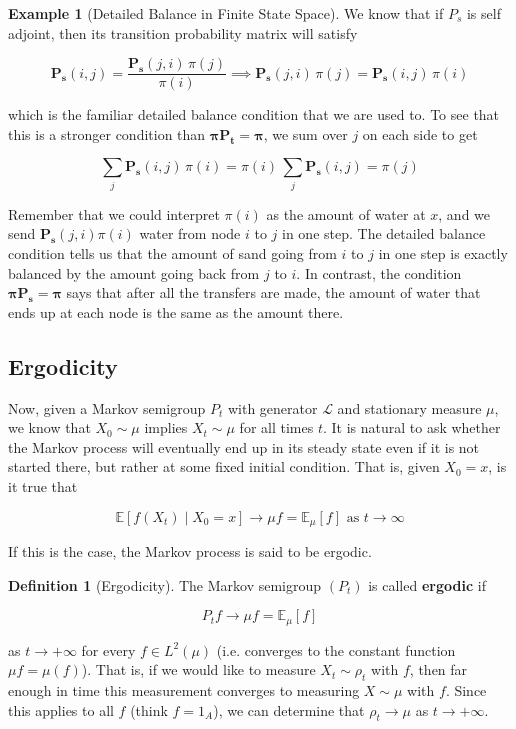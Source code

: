 \documentclass{article}
\theoremstyle{definition}
\newtheorem{example}{Example}[section]
\theoremstyle{remark}
\theoremstyle{definition}
\newtheorem{definition}{Definition}[section]
\begin{document}
    \begin{example}[Detailed Balance in Finite State Space]
      We know that if $P_s$ is self adjoint, then its transition probability matrix will satisfy 

        \[\mathbf{P_s}(i, j) = \frac{\mathbf{P_s}(j, i) \, \pi(j)}{\pi(i)} \implies \mathbf{P_s}(j, i) \, \pi(j) = \mathbf{P_s}(i, j) \, \pi(i)\]

      which is the familiar detailed balance condition that we are used to. To see that this is a stronger condition than $\boldsymbol{\pi} \mathbf{P_t} = \boldsymbol{\pi}$, we sum over $j$ on each side to get 

        \[\sum_j \mathbf{P_s}(i, j) \, \pi(i) = \pi(i) \, \sum_j \mathbf{P_s}(i, j) = \pi(j)\]

      Remember that we could interpret $\pi(i)$ as the amount of water at $x$, and we send $\mathbf{P_s}(j, i) \pi(i)$ water from node $i$ to $j$ in one step. The detailed balance condition tells us that the amount of sand going from $i$ to $j$ in one step is exactly balanced by the amount going back from $j$ to $i$. In contrast, the condition $\boldsymbol{\pi} \mathbf{P_s} = \boldsymbol{\pi}$ says that after all the transfers are made, the amount of water that ends up at each node is the same as the amount there. 
    \end{example}

  \subsection{Ergodicity}

    Now, given a Markov semigroup $P_t$ with generator $\mathscr{L}$ and stationary measure $\mu$, we know that $X_0 \sim \mu$ implies $X_t \sim \mu$ for all times $t$. It is natural to ask whether the Markov process will eventually end up in its steady state even if it is not started there, but rather at some fixed initial condition. That is, given $X_0 = x$, is it true that 

      \[\mathbb{E}[f(X_t) \mid X_0 = x] \rightarrow \mu f = \mathbb{E}_\mu [f] \text{ as } t \rightarrow \infty\]

    If this is the case, the Markov process is said to be ergodic. 

    \begin{definition}[Ergodicity]
      The Markov semigroup $(P_t)$ is called \textbf{ergodic} if 

        \[P_t f \rightarrow \mu f = \mathbb{E}_\mu [f]\]

      as $t \rightarrow +\infty$ for every $f \in L^2 (\mu)$ (i.e. converges to the constant function $\mu f = \mu(f)$). That is, if we would like to measure $X_t \sim \rho_t$ with $f$, then far enough in time this measurement converges to measuring $X \sim \mu$ with $f$. Since this applies to all $f$ (think $f = 1_A$), we can determine that $\rho_t \rightarrow \mu$ as $t \rightarrow +\infty$. 
    \end{definition}
\end{document}
